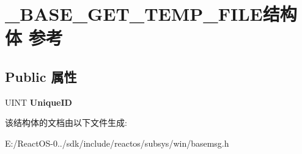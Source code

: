 \hypertarget{struct___b_a_s_e___g_e_t___t_e_m_p___f_i_l_e}{}\section{\+\_\+\+B\+A\+S\+E\+\_\+\+G\+E\+T\+\_\+\+T\+E\+M\+P\+\_\+\+F\+I\+L\+E结构体 参考}
\label{struct___b_a_s_e___g_e_t___t_e_m_p___f_i_l_e}
\subsection*{Public 属性}
\begin{DoxyCompactItemize}
\item 
\mbox{\label{struct___b_a_s_e___g_e_t___t_e_m_p___f_i_l_e_a07941d397a1fb6a709b714b525ff99de}} 
U\+I\+NT {\bfseries Unique\+ID}
\end{DoxyCompactItemize}


该结构体的文档由以下文件生成\+:\begin{DoxyCompactItemize}
\item 
E\+:/\+React\+O\+S-\/0../sdk/include/reactos/subsys/win/basemsg.\+h\end{DoxyCompactItemize}
